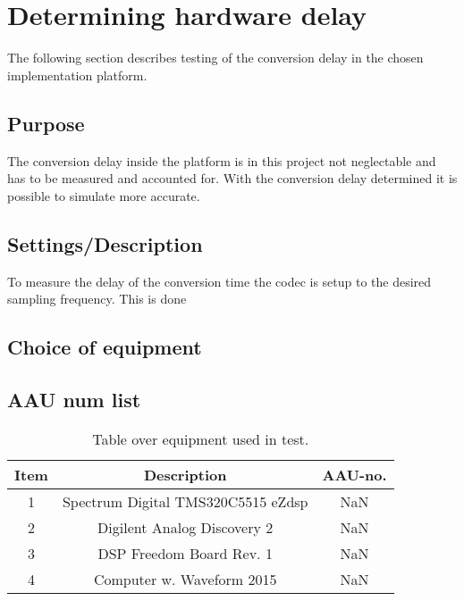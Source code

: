\section{Determining hardware delay} \label{sec:HardwareDelay}

The following section describes testing of the conversion delay in the chosen implementation platform.

\subsection{Purpose}

The conversion delay inside the platform is in this project not neglectable and has to be measured and accounted for. With the conversion delay determined it is possible to simulate more accurate. %


\subsection{Settings/Description}

To measure the delay of the conversion time the codec is setup to the desired sampling frequency. This is done 





\subsection{Choice of equipment}


\subsection{AAU num list}

\begin{table}[H]
	\centering
	\begin{tabular}{ c c c } \toprule
		{Item}	& {Description} 						& {AAU-no}. \\ \bottomrule 
		1	&	Spectrum Digital TMS320C5515 eZdsp	& NaN	\\
		2	&	Digilent Analog Discovery 2	& NaN		\\
		3	&	DSP Freedom Board Rev. 1 & NaN		\\
		4	&	Computer w. Waveform 2015					& NaN		\\
		\bottomrule
	\end{tabular}
	\caption{Table over equipment used in test.}
	\label{tab:MeasDelayTable}
\end{table}

